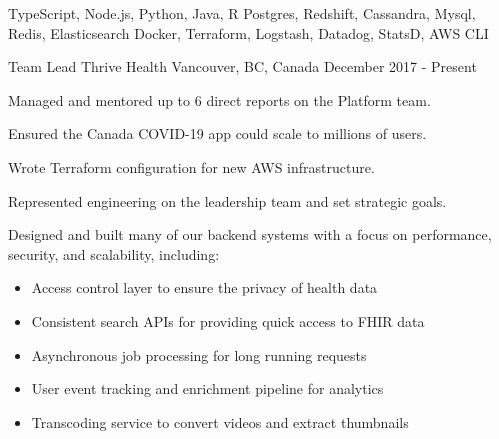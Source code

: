 \begin{cvskills}
   {TypeScript, Node.js, Python, Java, R}
   {Postgres, Redshift, Cassandra, Mysql, Redis, Elasticsearch}
   {Docker, Terraform, Logstash, Datadog, StatsD, AWS CLI}
\end{cvskills}




\begin{cventries}

  \cventry
    {Team Lead} %
    {Thrive Health} %
    {Vancouver, BC, Canada} %
    {December 2017 - Present} %
    {
      \begin{cvitems} %
        \item {Managed and mentored up to 6 direct reports on the Platform team.}
        \item {Ensured the Canada COVID-19 app could scale to millions of users.}
        \item {Wrote Terraform configuration for new AWS infrastructure.}
        \item {Represented engineering on the leadership team and set strategic goals.}
        \item {Designed and built many of our backend systems with a focus on performance, security, and scalability, including:}
        \begin{itemize}
          \item {Access control layer to ensure the privacy of health data}
          \item {Consistent search APIs for providing quick access to FHIR data}
          \item {Asynchronous job processing for long running requests}
          \item {User event tracking and enrichment pipeline for analytics}
          \item {Transcoding service to convert videos and extract thumbnails}
        \end{itemize}
      \end{cvitems}
    }


\end{cventries}
